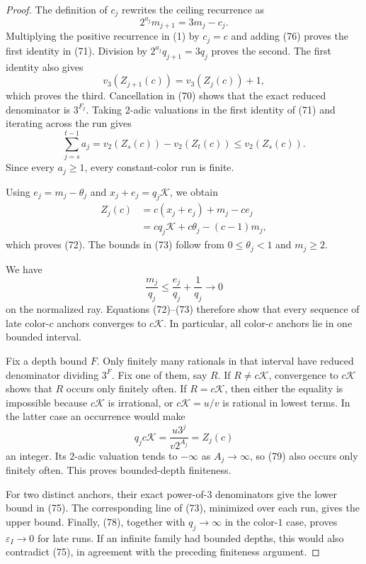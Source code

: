 \documentclass[11pt]{article}
\begin{document}
\begin{proof}
The definition of $c_j$ rewrites the ceiling recurrence as
\[
  2^{a_j}m_{j+1}=3m_j-c_j.
  \tag{76}
\]
Multiplying the positive recurrence in (1) by $c_j=c$ and adding (76)
proves the first identity in (71).  Division by
$2^{a_j}q_{j+1}=3q_j$ proves the second.  The first identity also gives
\[
  v_3(Z_{j+1}(c))=v_3(Z_j(c))+1,
  \tag{77}
\]
which proves the third.  Cancellation in (70) shows that the exact reduced
denominator is $3^{F_I}$.  Taking $2$-adic valuations in the first identity
of (71) and iterating across the run gives
\[
  \sum_{j=s}^{t-1}a_j
  =v_2(Z_s(c))-v_2(Z_t(c))
  \leq v_2(Z_s(c)).
\]
Since every $a_j\geq1$, every constant-color run is finite.

Using $e_j=m_j-\theta_j$ and $x_j+e_j=q_j\mathcal K$, we obtain
\[
\begin{aligned}
  Z_j(c)
  &=c(x_j+e_j)+m_j-ce_j\\
  &=cq_j\mathcal K+c\theta_j-(c-1)m_j,
\end{aligned}
\]
which proves (72).  The bounds in (73) follow from
$0\leq\theta_j<1$ and $m_j\geq2$.

We have
\[
  \frac{m_j}{q_j}
  \leq\frac{e_j}{q_j}+\frac1{q_j}
  \longrightarrow0
  \tag{78}
\]
on the normalized ray.  Equations (72)--(73) therefore show that every
sequence of late color-$c$ anchors converges to $c\mathcal K$.  In
particular, all color-$c$ anchors lie in one bounded interval.

Fix a depth bound $F$.  Only finitely many rationals in that interval have
reduced denominator dividing $3^F$.  Fix one of them, say $R$.  If
$R\neq c\mathcal K$, convergence to $c\mathcal K$ shows that $R$ occurs
only finitely often.  If $R=c\mathcal K$, then either the equality is
impossible because $c\mathcal K$ is irrational, or $c\mathcal K=u/v$ is
rational in lowest terms.  In the latter case an occurrence would make
\[
  q_jc\mathcal K=\frac{u3^j}{v2^{A_j}}=Z_j(c)
  \tag{79}
\]
an integer.  Its $2$-adic valuation tends to $-\infty$ as
$A_j\to\infty$, so (79) also occurs only finitely often.  This proves
bounded-depth finiteness.

For two distinct anchors, their exact power-of-$3$ denominators give the
lower bound in (75).  The corresponding line of (73), minimized over each
run, gives the upper bound.  Finally, (78), together with $q_j\to\infty$
in the color-$1$ case, proves $\varepsilon_I\to0$ for late runs.  If an
infinite family had bounded depths, this would also contradict (75), in
agreement with the preceding finiteness argument.
\end{proof}
\end{document}
